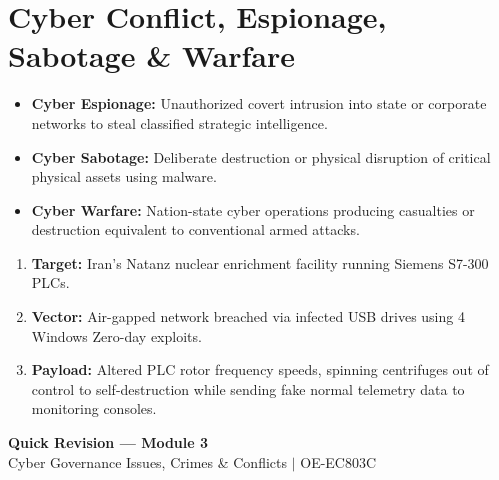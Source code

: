 \documentclass[12pt,a4paper]{article}
\begin{document}
\section{Cyber Conflict, Espionage, Sabotage \& Warfare}

\begin{tcolorbox}[defbox, title={\textbf{Definition: Cyber Warfare, Espionage \& Sabotage}}]
\begin{itemize}[leftmargin=*, itemsep=3pt]
  \item \textbf{Cyber Espionage:} Unauthorized covert intrusion into state or corporate networks to steal classified strategic intelligence.
  \item \textbf{Cyber Sabotage:} Deliberate destruction or physical disruption of critical physical assets using malware.
  \item \textbf{Cyber Warfare:} Nation-state cyber operations producing casualties or destruction equivalent to conventional armed attacks.
\end{itemize}
\end{tcolorbox}

\begin{tcolorbox}[examplebox, title={\textbf{Historical Case Study: Stuxnet Natanz Centrifuge Sabotage (2010)}}]
\begin{enumerate}[leftmargin=*, itemsep=3pt]
  \item \textbf{Target:} Iran's Natanz nuclear enrichment facility running Siemens S7-300 PLCs.
  \item \textbf{Vector:} Air-gapped network breached via infected USB drives using 4 Windows Zero-day exploits.
  \item \textbf{Payload:} Altered PLC rotor frequency speeds, spinning centrifuges out of control to self-destruction while sending fake normal telemetry data to monitoring consoles.
\end{enumerate}
\end{tcolorbox}

\newpage
\begin{center}
  {\large\bfseries\color{myred} Quick Revision --- Module 3}\\[3pt]
  {\small\color{mydark} Cyber Governance Issues, Crimes \& Conflicts $|$ OE-EC803C}
\end{center}
\noindent{\color{myred}\rule{\linewidth}{1.2pt}}
\vspace{4pt}
\end{document}
